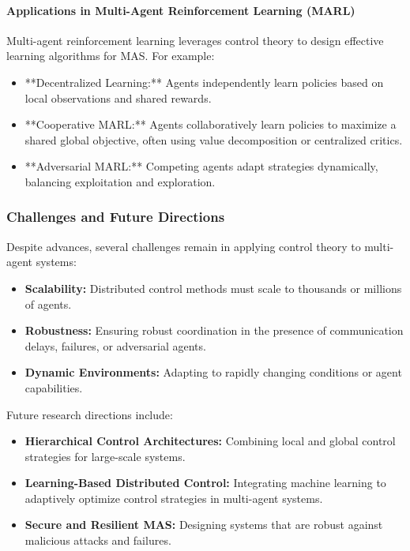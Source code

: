 \documentclass{IEEEojcsys}
\begin{document}
\paragraph{Applications in Multi-Agent Reinforcement Learning (MARL)}
Multi-agent reinforcement learning leverages control theory to design effective learning algorithms for MAS. For example:
\begin{itemize}
    \item **Decentralized Learning:** Agents independently learn policies based on local observations and shared rewards.
    \item **Cooperative MARL:** Agents collaboratively learn policies to maximize a shared global objective, often using value decomposition or centralized critics.
    \item **Adversarial MARL:** Competing agents adapt strategies dynamically, balancing exploitation and exploration.
\end{itemize}

\subsubsection{Challenges and Future Directions}
Despite advances, several challenges remain in applying control theory to multi-agent systems:
\begin{itemize}
    \item \textbf{Scalability:} Distributed control methods must scale to thousands or millions of agents.
    \item \textbf{Robustness:} Ensuring robust coordination in the presence of communication delays, failures, or adversarial agents.
    \item \textbf{Dynamic Environments:} Adapting to rapidly changing conditions or agent capabilities.
\end{itemize}

Future research directions include:
\begin{itemize}
    \item \textbf{Hierarchical Control Architectures:} Combining local and global control strategies for large-scale systems.
    \item \textbf{Learning-Based Distributed Control:} Integrating machine learning to adaptively optimize control strategies in multi-agent systems.
    \item \textbf{Secure and Resilient MAS:} Designing systems that are robust against malicious attacks and failures.
\end{itemize}
\end{document}
